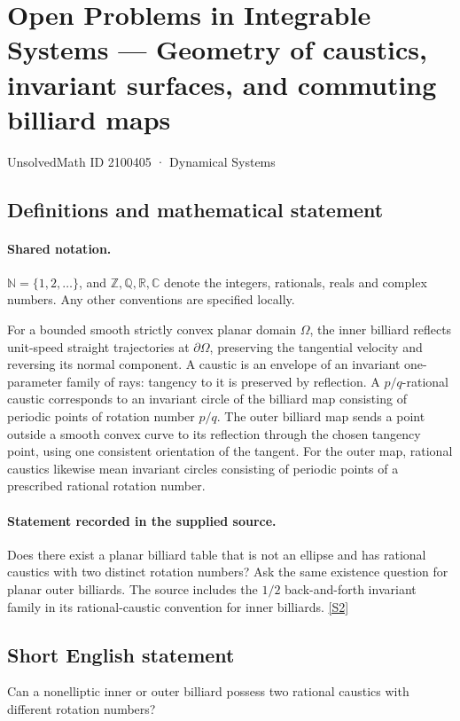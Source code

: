 \documentclass[11pt]{article}
\newcommand{\sref}[2]{\hyperlink{source:#1:#2}{[S#2]}}
\begin{document}
\setcounter{section}{2100404}
\section{Open Problems in Integrable Systems — Geometry of caustics, invariant surfaces, and commuting billiard maps}\label{2100405}
{\small\sffamily UnsolvedMath ID 2100405 · Dynamical Systems}
\subsection{Definitions and mathematical statement}

\paragraph{Shared notation.}$\mathbb N=\{1,2,\ldots\}$, and $\mathbb Z,\mathbb Q,\mathbb R,\mathbb C$ denote the integers, rationals, reals and complex numbers. Any other conventions are specified locally.


For a bounded smooth strictly convex planar domain $\Omega$, the inner billiard reflects unit-speed straight trajectories at $\partial\Omega$, preserving the tangential velocity and reversing its normal component. A caustic is an envelope of an invariant one-parameter family of rays: tangency to it is preserved by reflection. A $p/q$-rational caustic corresponds to an invariant circle of the billiard map consisting of periodic points of rotation number $p/q$. The outer billiard map sends a point outside a smooth convex curve to its reflection through the chosen tangency point, using one consistent orientation of the tangent. For the outer map, rational caustics likewise mean invariant circles consisting of periodic points of a prescribed rational rotation number.
\paragraph{Statement recorded in the supplied source.}
Does there exist a planar billiard table that is not an ellipse and has rational caustics with two distinct rotation numbers? Ask the same existence question for planar outer billiards. The source includes the $1/2$ back-and-forth invariant family in its rational-caustic convention for inner billiards. \sref{2100405}{2}
\subsection{Short English statement}
Can a nonelliptic inner or outer billiard possess two rational caustics with different rotation numbers?
\end{document}
